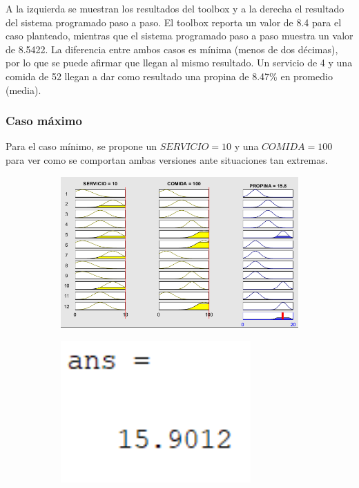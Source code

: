 \documentclass[11pt, letterpaper]{article}
\begin{document}
A la izquierda se muestran los resultados del toolbox y a la derecha el resultado del sistema programado paso a paso. El toolbox reporta un valor de 8.4 para el caso planteado, mientras que el sistema programado paso a paso muestra un valor de 8.5422. La diferencia entre ambos casos es mínima (menos de dos décimas), por lo que se puede afirmar que llegan al mismo resultado. Un servicio de 4 y una comida de 52 llegan a dar como resultado una propina de 8.47\% en promedio (media).

\newpage

\subsubsection{Caso máximo}
Para el caso mínimo, se propone un $SERVICIO = 10$ y una $COMIDA = 100$ para ver como se comportan ambas versiones ante situaciones tan extremas.

\begin{figure}[h]
	\centering
	\begin{subfigure}{0.40\textwidth} %
		\centering
		\includegraphics[width=1.4\textwidth]{IMG/RP13.png}
		\label{fig:G7}
	\end{subfigure}
	\hfill
	\begin{subfigure}{0.42\textwidth} %
		\centering
		\includegraphics[width=0.8\textwidth]{IMG/M13.png}
		\label{fig:G8}
	\end{subfigure}
	\label{fig:comparacion4}
\end{figure}
\end{document}

